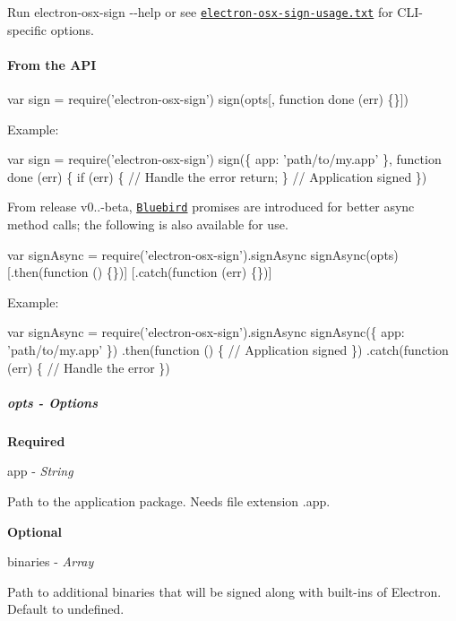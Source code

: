 Run {\ttfamily electron-\/osx-\/sign -\/-\/help} or see \href{https://github.com/electron-userland/electron-osx-sign/blob/master/bin/electron-osx-sign-usage.txt}{\tt electron-\/osx-\/sign-\/usage.\+txt} for C\+L\+I-\/specific options.

\paragraph*{From the A\+PI}


\begin{DoxyCode}
var sign = require('electron-osx-sign')
sign(opts[, function done (err) \{\}])
\end{DoxyCode}


Example\+:


\begin{DoxyCode}
var sign = require('electron-osx-sign')
sign(\{
  app: 'path/to/my.app'
\}, function done (err) \{
  if (err) \{
    // Handle the error
    return;
  \}
  // Application signed
\})
\end{DoxyCode}


From release v0..-\/beta, \href{https://github.com/petkaantonov/bluebird}{\tt Bluebird} promises are introduced for better async method calls; the following is also available for use.


\begin{DoxyCode}
var signAsync = require('electron-osx-sign').signAsync
signAsync(opts)
  [.then(function () \{\})]
  [.catch(function (err) \{\})]
\end{DoxyCode}


Example\+:


\begin{DoxyCode}
var signAsync = require('electron-osx-sign').signAsync
signAsync(\{
  app: 'path/to/my.app'
\})
  .then(function () \{
    // Application signed
  \})
  .catch(function (err) \{
    // Handle the error
  \})
\end{DoxyCode}


\subparagraph*{opts -\/ Options}

{\bfseries Required}

{\ttfamily app} -\/ {\itshape String}

Path to the application package. Needs file extension {\ttfamily .app}.

{\bfseries Optional}

{\ttfamily binaries} -\/ {\itshape Array}

Path to additional binaries that will be signed along with built-\/ins of Electron. Default to {\ttfamily undefined}.

